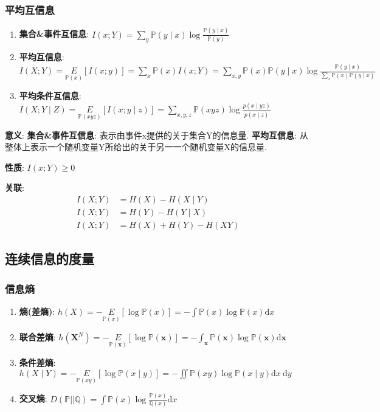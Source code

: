 \documentclass{article}
\begin{document}
        \subsubsection{平均互信息}
            \begin{enumerate}
                \item \textbf{集合&事件互信息}: $I(x ; Y)=\sum\limits_{y} \mathbb P(y \mid x) \log \frac{\mathbb P(y \mid x)}{\mathbb P(y)}$
                \item \textbf{平均互信息}: $I(X ; Y) = \underset{\mathbb P(x)}{E}[I(x ; y)] = \sum\limits_{x} \mathbb P(x) I(x ; Y)=\sum\limits_{x, y} \mathbb P(x) \mathbb P(y \mid x) \log \frac{\mathbb P(y \mid x)}{\sum\limits_{x} \mathbb P(x) \mathbb P(y \mid x)}$
                \item \textbf{平均条件互信息}: $I(X ; Y \mid Z)=\underset{\mathbb P(x y z)}{E}[I(x ; y \mid z)]=\sum\limits_{x, y, z} \mathbb P(x y z) \log \frac{p(x \mid y z)}{p(x \mid z)}$
            \end{enumerate}
            
            \textbf{意义}: \textbf{集合&事件互信息}: 表示由事件x提供的关于集合Y的信息量. \textbf{平均互信息}: 从整体上表示一个随机变量Y所给出的关于另一一个随机变量X的信息量.
            
            \textbf{性质}: $I(x ; Y) \ge 0$
            
            \textbf{关联}: 
                \begin{align*}
                    I(X ; Y) &= H(X)-H(X \mid Y) \\
                    I(X ; Y) &= H(Y)-H(Y \mid X) \\
                    I(X ; Y) &= H(X)+H(Y)-H(X Y)
                \end{align*}
             
    \subsection{连续信息的度量}
        \subsubsection{信息熵}
            \begin{enumerate}
                \item \textbf{熵(差熵)}: $h(X)=-\underset{\mathbb P(x)}{E}[\log \mathbb P(x)]=-\int \mathbb P(x) \log \mathbb P(x) \mathrm{d} x$
                \item \textbf{联合差熵}: $h\left(\boldsymbol{X}^{N}\right)=-\underset{\mathbb P(\boldsymbol{x})}{E}[\log \mathbb P(\boldsymbol{x})]=-\int_{\boldsymbol{x}} \mathbb P(\boldsymbol{x}) \log \mathbb P(\boldsymbol{x}) \mathrm{d} \boldsymbol{x}$
                \item \textbf{条件差熵}: $h(X \mid Y)=-\underset{\mathbb P(x y)}{E}[\log \mathbb P(x \mid y)]=-\iint \mathbb P(x y) \log \mathbb P(x \mid y) \mathrm{d} x \mathrm{~d} y$
                \item \textbf{交叉熵}: $D(\mathbb P || \mathbb Q)=\int \mathbb P(x) \log \frac{\mathbb P(x)}{\mathbb Q(x)} \mathrm{d} x$
            \end{enumerate}
            
\end{document}
